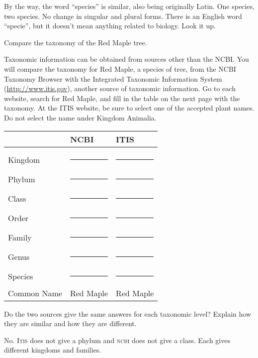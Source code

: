 \documentclass[11pt]{exam}
\newcommand*\AnswerBox[2]{%
    \parbox[t][#1]{0.92\textwidth}{%
    \begin{solution}#2\end{solution}}
    \vspace*{\stretch{1}}
}
\begin{document}
\begin{questions}
By the way, the word “species” is similar, also being originally Latin.
One species, two species. No change in singular and plural forms. There
is an English word “specie”, but it doesn’t mean anything related to
biology. Look it up.

\question
Compare the taxonomy of the Red Maple tree.

Taxonomic information can be obtained from sources other than the NCBI. You will compare the taxonomy for Red Maple, a species of tree, from the NCBI Taxonomy Browser with the Integrated Taxonomic Information System (\url{http://www.itis.gov}), another source of taxonomic information. Go to each website, search for Red Maple, and fill in the table on the next page with the taxonomy. At the ITIS website, be sure to select one of the accepted plant names. Do not select the name under Kingdom Animalia. 

\newpage

\begin{longtable}[l]{@{}L{0.75in}L{1.1in}L{1.1in}@{}}
\toprule
& \hfil NCBI\hfill & \hfil ITIS \hfill \tabularnewline
\midrule
 & & \\
Kingdom & 
\else\rule{1in}{0.4pt}\fi & 
\else\rule{1in}{0.4pt}\fi \tabularnewline[3ex]
%
Phylum & 
\else\rule{1in}{0.4pt}\fi & 
\else\rule{1in}{0.4pt}\fi \tabularnewline[3ex]
%
Class & 
\else\rule{1in}{0.4pt}\fi & 
\else\rule{1in}{0.4pt}\fi \tabularnewline[3ex]
%
Order & 
\else\rule{1in}{0.4pt}\fi & 
\else\rule{1in}{0.4pt}\fi \tabularnewline[3ex]
%
Family & 
\else\rule{1in}{0.4pt}\fi & 
\else\rule{1in}{0.4pt}\fi \tabularnewline[3ex]
%
Genus & 
\else\rule{1in}{0.4pt}\fi & 
\else\rule{1in}{0.4pt}\fi \tabularnewline[3ex]
%
Species & 
\else\rule{1in}{0.4pt}\fi & 
\else\rule{1in}{0.4pt}\fi \tabularnewline[3ex]
%
Common Name & Red Maple & Red Maple \tabularnewline[3ex]
\bottomrule
\end{longtable}

\question
Do the two sources give the same answers for each taxonomic level? Explain how they are similar and how they are different.

\AnswerBox{1\baselineskip}{%
No. I\textsc{tis} does not give a phylum and \textsc{ncbi} does not give a class. Each gives different kingdoms and families.
}


\end{questions}
\end{document}
